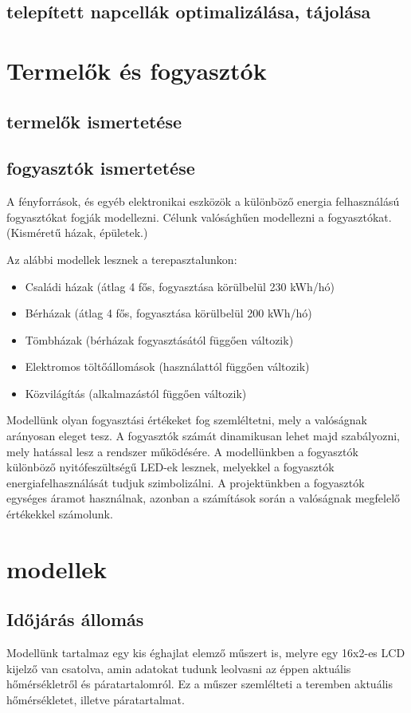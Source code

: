 \documentclass[
]{thesis-ekf}
\theoremstyle{definition}
\theoremstyle{remark}
\begin{document}
		\subsection{telepített napcellák optimalizálása, tájolása}
	\section{Termelők és fogyasztók}
		\subsection{termelők ismertetése}
		\subsection{fogyasztók ismertetése}
		\par A fényforrások, és egyéb elektronikai eszközök a különböző energia felhasználású fogyasztókat fogják modellezni. Célunk valósághűen modellezni a fogyasztókat. (Kisméretű házak, épületek.) 
		\par Az alábbi modellek lesznek a terepasztalunkon:
		\begin{itemize}
			\item Családi házak (átlag 4 fős, fogyasztása körülbelül 230 kWh/hó)
			\item Bérházak (átlag 4 fős, fogyasztása körülbelül 200 kWh/hó)
			\item Tömbházak (bérházak fogyasztásától függően változik)
			\item Elektromos töltőállomások (használattól függően változik)
			\item Közvilágítás (alkalmazástól függően változik)
		\end{itemize}
	
		Modellünk olyan fogyasztási értékeket fog szemléltetni, mely a valóságnak arányosan eleget tesz. A fogyasztók számát dinamikusan lehet majd szabályozni, mely hatással lesz a rendszer működésére. A modellünkben a fogyasztók különböző nyitófeszültségű LED-ek lesznek, melyekkel a fogyasztók energiafelhasználását tudjuk szimbolizálni. A projektünkben a fogyasztók egységes áramot használnak, azonban a számítások során a valóságnak megfelelő értékekkel számolunk.
		
	\section{modellek}
		\subsection{Időjárás állomás}
			\par Modellünk tartalmaz egy kis éghajlat elemző műszert is, melyre egy 16x2-es LCD kijelző van csatolva, amin adatokat tudunk leolvasni az éppen aktuális hőmérsékletről és páratartalomról. Ez a műszer szemlélteti a teremben aktuális hőmérsékletet, illetve páratartalmat.
\end{document}
